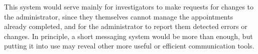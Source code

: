 \begin{itemize}
  This system would serve mainly for investigators to make requests for changes to the administrator, since they themselves cannot manage the appointments already completed, and for the administrator to report them detected errors or changes. In principle, a short messaging system would be more than enough, but putting it into use may reveal other more useful or efficient communication tools. \\

\end{itemize}
    
    
    
    
    
    
